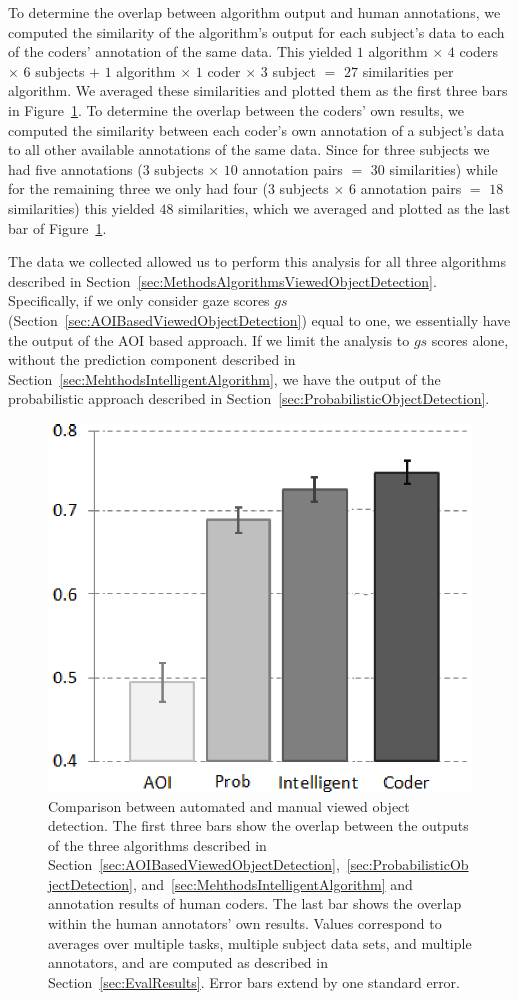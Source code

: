 To determine the overlap between algorithm output and human annotations, we computed the similarity of the algorithm's output for each subject's data to each of the coders' annotation of the same data.  This yielded $1$ algorithm $\times$ $4$ coders $\times$ $6$ subjects $+$  $1$ algorithm $\times$ $1$ coder $\times$ $3$ subject $=$ $27$ similarities per algorithm. We averaged these similarities and plotted them as the first three bars in Figure~\ref{fig:quantitative}. To determine the overlap between the coders' own results, we computed the similarity between each coder's own annotation of a subject's data to all other available annotations of the same data. Since for three subjects we had five annotations ($3$ subjects $\times$ $10$ annotation pairs $=$ $30$ similarities) while for the remaining three we only had four ($3$ subjects $\times$ $6$ annotation pairs $=$ $18$ similarities) this yielded $48$ similarities, which we averaged and plotted as the last bar of Figure~\ref{fig:quantitative}.

The data we collected allowed us to perform this analysis for all three algorithms described in Section~\ref{sec:MethodsAlgorithmsViewedObjectDetection}. Specifically, if we only consider gaze scores $gs$ (Section~\ref{sec:AOIBasedViewedObjectDetection}) equal to one, we essentially have the output of the AOI based approach. If we limit the analysis to $gs$ scores alone, without the prediction component described in Section~\ref{sec:MehthodsIntelligentAlgorithm}, we have the output of the probabilistic approach described in Section~\ref{sec:ProbabilisticObjectDetection}.

\begin{figure}[htb]
  \centering
  \includegraphics[width=0.6\linewidth]{images/algosComparison.eps}
  \caption{Comparison between automated and manual viewed object detection. The first three bars show the overlap between the outputs of the three algorithms described in Section~\ref{sec:AOIBasedViewedObjectDetection},~\ref{sec:ProbabilisticObjectDetection}, and~\ref{sec:MehthodsIntelligentAlgorithm} and annotation results of human coders. The last bar shows the overlap within the human annotators' own results. Values correspond to averages over multiple tasks, multiple subject data sets, and multiple annotators, and are computed as described in Section~\ref{sec:EvalResults}. Error bars extend by one standard error.}
	\label{fig:quantitative}
\end{figure}


